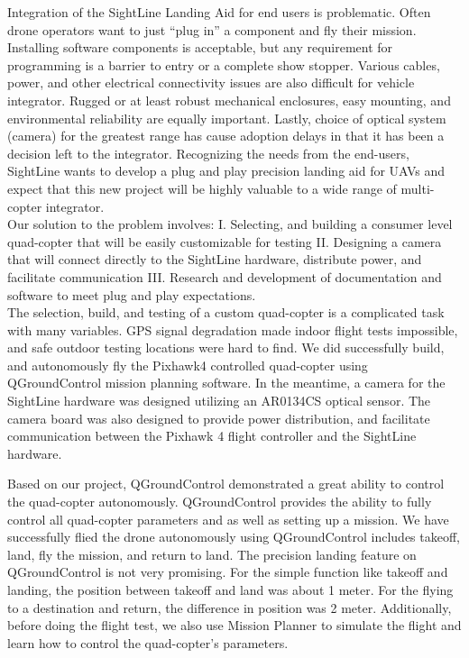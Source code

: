 \documentclass[11pt]{article}
\begin{document}
 Integration of the SightLine Landing Aid for end users is problematic.  Often drone operators want to just “plug in” a component and fly their mission.  Installing software components is acceptable, but any requirement for programming is a barrier to entry or a complete show stopper.  Various cables, power, and other electrical connectivity issues are also difficult for vehicle integrator.  Rugged or at least robust mechanical enclosures, easy mounting, and environmental reliability are equally important.  Lastly, choice of optical system (camera) for the greatest range has cause adoption delays in that it has been a decision left to the integrator. Recognizing the needs from the end-users, SightLine wants to develop a plug and play precision landing aid for UAVs and expect that this new project will be highly valuable to a wide range of multi-copter integrator.
\\
 Our solution to the problem involves: I. Selecting, and building a consumer level quad-copter that will  be easily customizable for testing II. Designing a camera that will connect directly to the SightLine hardware, distribute power, and facilitate communication III. Research and development of documentation and software to meet plug and play expectations.
\\
 The selection, build, and testing of a custom quad-copter is a complicated task with many variables. GPS signal degradation made indoor flight tests impossible, and safe outdoor testing locations were hard to find. We did successfully build, and autonomously fly the Pixhawk4 controlled quad-copter using QGroundControl mission planning software. In the meantime, a camera for the SightLine hardware was designed utilizing an AR0134CS optical sensor. The camera board was also designed to provide power distribution, and facilitate communication between the Pixhawk 4 flight controller and the SightLine hardware.


Based on our project, QGroundControl demonstrated a great ability to control the quad-copter autonomously. QGroundControl provides the ability to fully control all quad-copter parameters and as well as setting up a mission. We have successfully flied the drone autonomously using QGroundControl includes takeoff, land, fly the mission, and return to land. The precision landing feature on QGroundControl is not very promising. For the simple function like takeoff and landing, the position between takeoff and land was about 1 meter. For the flying to a destination and return, the difference in position was 2 meter. Additionally, before doing the flight test, we also use Mission Planner to simulate the flight and learn how to control the quad-copter's parameters.
   
\end{document}
